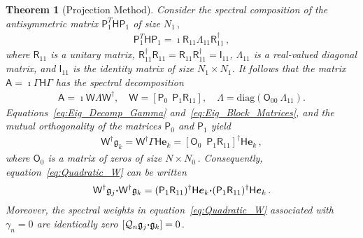 \documentclass[english,12pt,jmp,graphicx]{revtex4-1}
\newcommand{\vecg}{\mathfrak{g}}
\newcommand{\vece}{\boldsymbol{e}}
\newcommand{\bcdot}{\mbox{\boldmath${\cdot}$}}
\newtheorem{theorem}{Theorem}
\newcommand{\Hm}{\mathsf{H}}
\newcommand{\Am}{\mathsf{A}}
\newcommand{\Wm}{\mathsf{W}}
\newcommand{\Pm}{\mathsf{P}}
\newcommand{\Rm}{\mathsf{R}}
\newcommand{\Ib}{\mathsf{I}}
\newcommand{\Om}{\mathsf{O}}
\newcommand{\Qc}{\mathcal{Q}}
\begin{document}
\begin{theorem}[Projection Method]
Consider the spectral composition of the antisymmetric
matrix $\Pm_1^T\Hm\Pm_1$ of size $N_1\,,$
%
\begin{align}\label{eq:Eig_Decomp_PHP}
  \Pm_1^T\Hm\Pm_1=\imath\Rm_{11}\Lambda_{11}\Rm_{11}^\dagger\,,
\end{align}
%
where $\Rm_{11}$ is a unitary matrix,
$\Rm_{11}^\dagger\Rm_{11}=\Rm_{11}\Rm_{11}^\dagger=\Ib_{11}$, 
$\Lambda_{11}$ is a real-valued diagonal matrix, and $\Ib_{11}$ is the
identity matrix of size $N_1\times N_1$. It follows that the matrix
$\Am=\imath\Gamma\Hm\Gamma$ has the spectral decomposition 
% 
\begin{align}\label{eq:Eig_Block_Matrices}
%
\Am=\imath\Wm\Lambda\Wm^\dagger,
\quad
\Wm=[\Pm_0 \ \ \Pm_1\Rm_{11}],
\quad
\Lambda=\text{diag}(\Om_{00} \ \Lambda_{11}).
\end{align}
% 
Equations~\eqref{eq:Eig_Decomp_Gamma}
and~\eqref{eq:Eig_Block_Matrices}, and the mutual orthogonality of the
matrices $\Pm_0$ and $\Pm_1$ yield
%
\begin{align}\label{eq:Wt_gk}
  \Wm^\dagger\vecg_k
  =\Wm^\dagger\Gamma\Hm\vece_k
  =[\Om_{0} \ \; \Pm_1\Rm_{11}]^\dagger\Hm\vece_k\,,
\end{align}
%
where $\Om_{0}$ is a matrix of zeros of size $N\times
N_0\,$. Consequently, equation~\eqref{eq:Quadratic_W} can be written
%
\begin{align}\label{eq:Quad_Proj_method}
  \Wm^\dagger\vecg_j\bcdot\Wm^\dagger\vecg_k
  =(\Pm_1\Rm_{11})^\dagger\Hm\vece_k\bcdot(\Pm_1\Rm_{11})^\dagger\Hm\vece_k\,.
\end{align}
%
Moreover, the spectral weights in equation~\eqref{eq:Quadratic_W}
associated with $\gamma_n=0$ are identically zero
$[\Qc_n\vecg_j\bcdot\vecg_k]=0\,.$ 
\end{theorem}
\end{document}

